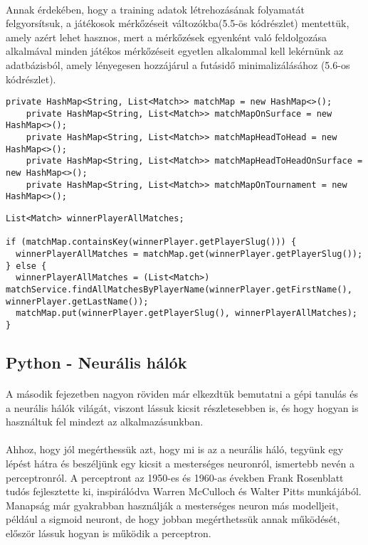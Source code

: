 \paragraph{}
Annak érdekében, hogy a training adatok létrehozásának folyamatát felgyorsítsuk, a játékosok mérkőzéseit változókba(5.5-ös kódrészlet) mentettük, amely azért lehet hasznos, mert a mérkőzések egyenként való feldolgozása alkalmával minden játékos mérkőzéseit egyetlen alkalommal kell lekérnünk az adatbázisból, amely lényegesen hozzájárul a futásidő minimalizálásához (5.6-os kódrészlet).

\begin{lstlisting}[caption=A futásidő minimalizálásához használt HashMap-ek listája]
    private HashMap<String, List<Match>> matchMap = new HashMap<>();
    private HashMap<String, List<Match>> matchMapOnSurface = new HashMap<>();
    private HashMap<String, List<Match>> matchMapHeadToHead = new HashMap<>();
    private HashMap<String, List<Match>> matchMapHeadToHeadOnSurface = new HashMap<>();
    private HashMap<String, List<Match>> matchMapOnTournament = new HashMap<>();
\end{lstlisting}

\begin{lstlisting}[caption=A győztes játékos meccseinek inicializálása]
List<Match> winnerPlayerAllMatches;

if (matchMap.containsKey(winnerPlayer.getPlayerSlug())) {
  winnerPlayerAllMatches = matchMap.get(winnerPlayer.getPlayerSlug());
} else {
  winnerPlayerAllMatches = (List<Match>) matchService.findAllMatchesByPlayerName(winnerPlayer.getFirstName(), winnerPlayer.getLastName());
  matchMap.put(winnerPlayer.getPlayerSlug(), winnerPlayerAllMatches);
}
\end{lstlisting}

\subsection{Python - Neurális hálók}
\paragraph{}
A második fejezetben nagyon röviden már elkezdtük bemutatni a gépi tanulás és a neurális hálók világát, viszont lássuk kicsit részletesebben is, és hogy hogyan is használtuk fel mindezt az alkalmazásunkban.

\paragraph{}
Ahhoz, hogy jól megérthessük azt, hogy mi is az a neurális háló, tegyünk egy lépést hátra és beszéljünk egy kicsit a mesterséges neuronról, ismertebb nevén a perceptronról. A perceptront az 1950-es és 1960-as években Frank Rosenblatt tudós fejlesztette ki, inspirálódva Warren McCulloch és Walter Pitts munkájából. Manapság már gyakrabban használják a mesterséges neuron más modelljeit, például a sigmoid neuront, de hogy jobban megérthetssük annak működését, először lássuk hogyan is működik a perceptron.

